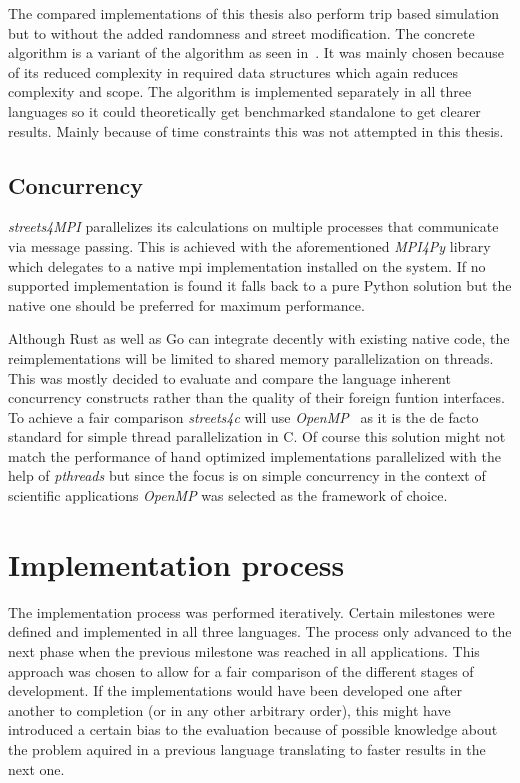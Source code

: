 The compared implementations of this thesis also perform trip based simulation but to without the added randomness and street modification. The concrete algorithm is a variant of the  algorithm as seen in~\cite[p. 16]{dijkstra_utcs}. It was mainly chosen because of its reduced complexity in required data structures which again reduces complexity and scope. The algorithm is implemented separately in all three languages so it could theoretically get benchmarked standalone to get clearer results. Mainly because of time constraints this was not attempted in this thesis.

\subsection*{Concurrency}
\label{subsec:Approach::Differences::Concurrency}

\textit{streets4MPI} parallelizes its calculations on multiple processes that communicate via message passing. This is achieved with the aforementioned \textit{MPI4Py} library which delegates to a native \gls{mpi} implementation installed on the system. If no supported implementation is found it falls back to a pure Python solution but the native one should be preferred for maximum performance.

Although Rust as well as Go can integrate decently with existing native code, the reimplementations will be limited to shared memory parallelization on threads. This was mostly decided to evaluate and compare the language inherent concurrency constructs rather than the quality of their foreign funtion interfaces. To achieve a fair comparison \textit{streets4c} will use \textit{OpenMP}~ as it is the de facto standard for simple thread parallelization in C. Of course this solution might not match the performance of hand optimized implementations parallelized with the help of \textit{pthreads} but since the focus is on simple concurrency in the context of scientific applications \textit{OpenMP} was selected as the framework of choice.


\section{Implementation process}
\label{sec:Approach::Implementation}

The implementation process was performed iteratively. Certain milestones were defined and implemented in all three languages. The process only advanced to the next phase when the previous milestone was reached in all applications. This approach was chosen to allow for a fair comparison of the different stages of development. If the implementations would have been developed one after another to completion (or in any other arbitrary order), this might have introduced a certain bias to the evaluation because of possible knowledge about the problem aquired in a previous language translating to faster results in the next one.

